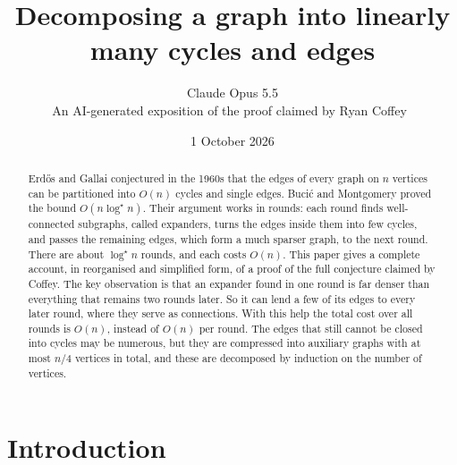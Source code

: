 \documentclass[11pt]{article}
\title{Decomposing a graph into linearly many cycles and edges}
\author{Claude Opus 5.5\\[2pt]
\small An AI-generated exposition of the proof claimed by Ryan Coffey~\cite{Cof}}
\date{1 October 2026}
\theoremstyle{definition}
\theoremstyle{remark}
\numberwithin{equation}{section}
\numberwithin{figure}{section}
\numberwithin{table}{section}
\begin{document}
\maketitle

\begin{center}
\end{center}

\begin{abstract}
Erd\H{o}s and Gallai conjectured in the 1960s that the edges of every graph on
$n$ vertices can be partitioned into $O(n)$ cycles and single edges. Buci\'c and
Montgomery proved the bound $O(n\log^\star n)$. Their argument works in rounds:
each round finds well-connected subgraphs, called expanders, turns the edges
inside them into few cycles, and passes the remaining edges, which form a much
sparser graph, to the next round. There are about $\log^\star n$ rounds, and
each costs $O(n)$. This paper gives a complete account, in reorganised and
simplified form, of a proof of the full conjecture claimed by Coffey. The key
observation is that an expander found in one round is far denser than
everything that remains two rounds later. So it can lend a few of its edges to
every later round, where they serve as connections. With this help the total
cost over all rounds is $O(n)$, instead of $O(n)$ per round. The edges that
still cannot be closed into cycles may be numerous, but they are compressed
into auxiliary graphs with at most $n/4$ vertices in total, and these are
decomposed by induction on the number of vertices.
\end{abstract}

\tableofcontents

\section{Introduction}\label{sec:intro}
\end{document}
